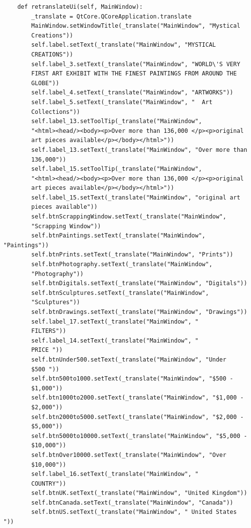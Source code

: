 \documentclass[12pt]{article}
\begin{document}
\begin{verbatim}
    def retranslateUi(self, MainWindow):
        _translate = QtCore.QCoreApplication.translate
        MainWindow.setWindowTitle(_translate("MainWindow", "Mystical
        Creations"))
        self.label.setText(_translate("MainWindow", "MYSTICAL
        CREATIONS"))
        self.label_3.setText(_translate("MainWindow", "WORLD\'S VERY
        FIRST ART EXHIBIT WITH THE FINEST PAINTINGS FROM AROUND THE
        GLOBE"))
        self.label_4.setText(_translate("MainWindow", "ARTWORKS"))
        self.label_5.setText(_translate("MainWindow", "  Art
        Collections"))
        self.label_13.setToolTip(_translate("MainWindow",
        "<html><head/><body><p>Over more than 136,000 </p><p>original
        art pieces available</p></body></html>"))
        self.label_13.setText(_translate("MainWindow", "Over more than
        136,000"))
        self.label_15.setToolTip(_translate("MainWindow",
        "<html><head/><body><p>Over more than 136,000 </p><p>original
        art pieces available</p></body></html>"))
        self.label_15.setText(_translate("MainWindow", "original art
        pieces available"))
        self.btnScrappingWindow.setText(_translate("MainWindow",
        "Scrapping Window"))
        self.btnPaintings.setText(_translate("MainWindow", "Paintings"))
        self.btnPrints.setText(_translate("MainWindow", "Prints"))
        self.btnPhotography.setText(_translate("MainWindow",
        "Photography"))
        self.btnDigitals.setText(_translate("MainWindow", "Digitals"))
        self.btnSculptures.setText(_translate("MainWindow",
        "Sculptures"))
        self.btnDrawings.setText(_translate("MainWindow", "Drawings"))
        self.label_17.setText(_translate("MainWindow", "
        FILTERS"))
        self.label_14.setText(_translate("MainWindow", " 
        PRICE "))
        self.btnUnder500.setText(_translate("MainWindow", "Under 
        $500 "))
        self.btn500to1000.setText(_translate("MainWindow", "$500 -
        $1,000"))
        self.btn1000to2000.setText(_translate("MainWindow", "$1,000 -
        $2,000"))
        self.btn2000to5000.setText(_translate("MainWindow", "$2,000 -
        $5,000"))
        self.btn5000to10000.setText(_translate("MainWindow", "$5,000 -
        $10,000"))
        self.btnOver10000.setText(_translate("MainWindow", "Over
        $10,000"))
        self.label_16.setText(_translate("MainWindow", "   
        COUNTRY"))
        self.btnUK.setText(_translate("MainWindow", "United Kingdom"))
        self.btnCanada.setText(_translate("MainWindow", "Canada"))
        self.btnUS.setText(_translate("MainWindow", " United States "))

\end{verbatim}
\end{document}
